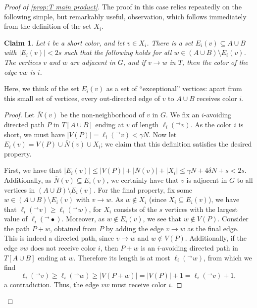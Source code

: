 \documentclass[11pt,reqno]{amsart}
\newtheorem{claim}[theorem]{Claim}
\theoremstyle{definition}
\newcommand\ol[1]{\overline{#1}}
\newcommand\ab[1]{\lvert#1\rvert}
\newcommand\1{\mathbf{1}}
\let\leq\leqslant
\let\geq\geqslant
\begin{document}
\begin{proof}[Proof of \cref{prop:T main product}]
    The proof in this case relies repeatedly on the following simple, but remarkably useful, observation, which follows immediately from the definition of the set $X_i$. 
    \begin{claim}\label{claim:exceptional}
        Let $i$ be a short color, and let $v \in X_i$. There is a set $E_i(v) \subseteq A \cup B$ with $\ab{E_i(v)}< 2s$ such that the following holds for all $w \in (A \cup B) \setminus  E_i(v)$. The vertices $v$ and $w$ are adjacent in $G$, and if $v\to w$ in $T$, then the color of the edge $vw$ is $i$.
    \end{claim}
    Here, we think of the set $E_i(v)$ as a set of ``exceptional'' vertices: apart from this small set of vertices, every out-directed edge of $v$ to $A \cup B$ receives color $i$. 
    \begin{proof}
        Let $\ol N(v)$ be the non-neighborhood of $v$ in $G$.
        We fix an $i$-avoiding directed path $P$ in $T[A\cup B]$ ending at $v$ of length $\ell_i(^\to v)$. As the color $i$ is short, we must have $\ab{V(P)}=\ell_i(^\to v)<\gamma N$. Now let $E_i(v)=V(P) \cup \ol N(v) \cup X_i$; we claim that this definition satisfies the desired property. 

        First, we have that $\ab{E_i(v)}\leq \ab{V(P)}+\ab{\ol N(v)}+\ab{X_i} \leq \gamma N+4\delta N+s < 2s$. Additionally, as $\ol N(v)\subseteq E_i(v)$, we certainly have that $v$ is adjacent in $G$ to all vertices in $(A\cup B) \setminus E_i(v)$. For the final property, fix some $w \in (A\cup B) \setminus E_i(v)$ with $v\to w$. As $w \notin X_i$ (since $X_i \subseteq E_i(v)$), we have that
        $\ell_i(^\to v) \geq \ell_i(^\to w)$, for $X_i$ consists of the $s$ vertices with the largest value of $\ell_i(^\to \bullet)$. Moreover, as $w \notin E_i(v)$, we see that $w \notin V(P)$. Consider the path $P +w$, obtained from $P$ by adding the edge $v\to w$ as the final edge. This is indeed a directed path, since $v\to w$ and $w \notin V(P)$. Additionally, if the edge $vw$ does not receive color $i$, then $P+w$ is an $i$-avoiding directed path in $T[A \cup B]$ ending at $w$. Therefore its length is at most $\ell_i(^\to w)$, from which we find
        \[
            \ell_i(^\to v) \geq \ell_i(^\to w) \geq \ab{V(P+w)} = \ab{V(P)}+1 = \ell_i(^\to v)+1,
        \]
        a contradiction. Thus, the edge $vw$ must receive color $i$. 
    \end{proof}


\end{proof}
\end{document}
